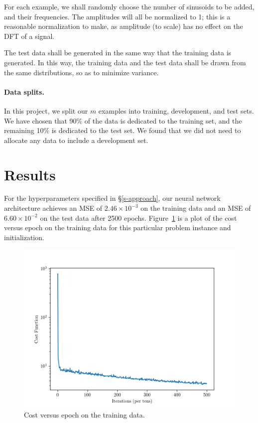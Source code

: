 \documentclass[12pt]{article}
\begin{document}
For each example, we shall randomly choose the number of sinusoids 
to be added, and their frequencies. The amplitudes will all be normalized to 1; this is a reasonable 
normalization to make, as amplitude (to scale) has no effect on the DFT of a signal.

The test data shall be generated in the same way that the training data is
generated. In this way, the training data and the test data shall be drawn from the same distributions,
so as to minimize variance.

\paragraph{Data splits.} In this project, we split our $m$ examples into training, development, and test
sets. We have chosen that 90\% of the data is dedicated to the training set, and the remaining 10\% is 
dedicated to the test set. We found that we did not need to allocate any data to include a development set.

\section{Results} For the hyperparameters specified in \S\ref{s-approach}, our neural network architecture achieves 
an MSE of $2.46 \times 10^{-3}$ on the training data and an MSE of $6.60 \times 10^{-2}$ on the test data after 2500 
epochs. Figure~\ref{f-example_cost_vs_epoch} is a plot of the cost versus epoch on the training data for this particular 
problem instance and initialization.

\begin{figure}
\centering
\includegraphics[scale=.75]{figures/final_cost_vs_epoch.png}
\caption{Cost versus epoch on the training data.}
\label{f-example_cost_vs_epoch}
\end{figure}
\end{document}

